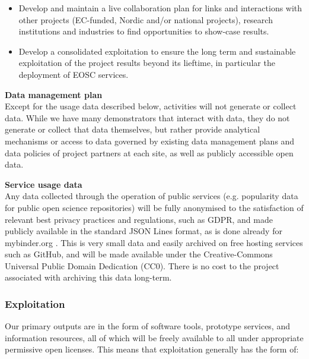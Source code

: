 \begin{framed}
{\begin{itemize}
\item Develop and maintain a live collaboration plan for links and interactions with other projects (EC-funded, Nordic and/or national projects), research institutions and industries to find opportunities to show-case \TheProject results.
\item Develop a consolidated exploitation to ensure the long term and sustainable exploitation of the project results beyond its lieftime, in particular the deployment of EOSC services.
    \end{itemize}
}
\end{framed}

\medskip
\noindent \textbf{Data management plan}\label{sec:data-management-plan}\\
Except for the usage data described below,
\TheProject activities will not generate or collect data.
While we have many demonstrators that interact with data, they do not generate or collect that
data themselves, but rather provide analytical mechanisms or access to data governed by
existing data management plans and data policies of project partners at each site,
as well as publicly accessible open data.

\noindent \textbf{Service usage data} \\
Any data collected through the operation of public services
(e.g. popularity data for public open science repositories)
will be fully anonymised to the satisfaction of relevant best privacy practices and regulations, such as GDPR,
and made publicly available in the standard JSON Lines format,
as is done already for mybinder.org \cite{mybinder-archive}.
This is very small data and easily archived on free hosting services such as GitHub,
and will be made available under the Creative-Commons Universal Public Domain Dedication (CC0).
There is no cost to the project associated with archiving this data long-term.

\subsubsection{Exploitation}

Our primary outputs are in the form of software tools, prototype services, and information resources,
all of which will be freely available to all under appropriate permissive open licenses.
This means that exploitation generally has the form of:

